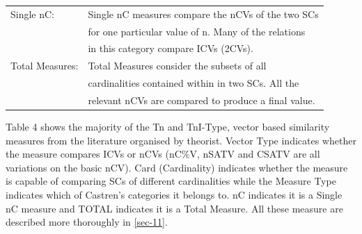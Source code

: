 \documentclass{article}
\begin{document}
\begin{center}
\begin{tabular}{ll}
 Single nC:       &  Single nC measures compare the nCVs of the two SCs    \\
                  &  for one particular value of n. Many of the relations  \\
                  &  in this category compare ICVs (2CVs).                 \\
 Total Measures:  &  Total Measures consider the subsets of all            \\
                  &  cardinalities contained within in two SCs. All the    \\
                  &  relevant nCVs are compared to produce a final value.  \\
\end{tabular}
\end{center}



Table 4 shows the majority of the Tn and TnI-Type, vector based
similarity measures from the literature organised by theorist. Vector
Type indicates whether the measure compares ICVs or nCVs (nC\%V, nSATV
and CSATV are all variations on the basic nCV). Card (Cardinality)
indicates whether the measure is capable of comparing SCs of different
cardinalities while the Measure Type indicates which of Castren's
categories it belongs to. nC indicates it is a Single nC measure and
TOTAL indicates it is a Total Measure. All these measure are described
more thoroughly in \ref{sec-11}.
\end{document}
